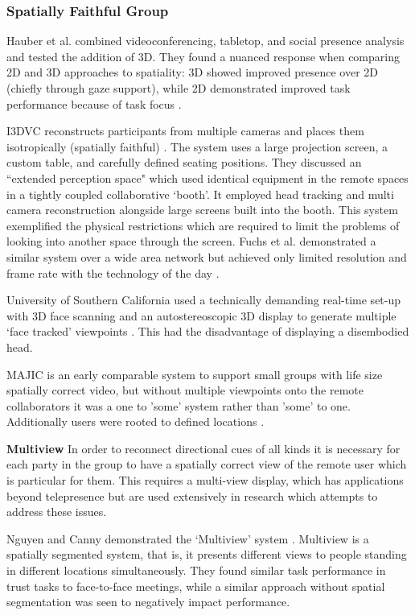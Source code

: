\subsubsection{Spatially Faithful Group}
Hauber et al. combined videoconferencing, tabletop, and social presence analysis and tested the addition of 3D. They found a nuanced response when comparing 2D and 3D approaches to spatiality: 3D showed improved presence over 2D (chiefly through gaze support), while 2D demonstrated improved task performance because of task focus \cite{Hauber2006}.\par
I3DVC reconstructs participants from multiple cameras and places them isotropically (spatially faithful) \cite{Kauff2002, Kauff2002a}. The system uses a large projection screen, a custom table, and carefully defined seating positions. They discussed an ``extended perception space" which used identical equipment in the remote spaces in a tightly coupled collaborative `booth'. It employed head tracking and multi camera reconstruction alongside large screens built into the booth. This system exemplified the physical restrictions which are required to limit the problems of looking into another space through the screen. Fuchs et al. demonstrated a similar system over a wide area network but achieved only limited resolution and frame rate with the technology of the day \cite{Fuchs2002}. \par University of Southern California used a technically demanding real-time set-up with 3D face scanning and an autostereoscopic 3D display to generate multiple `face tracked' viewpoints \cite{Jones2009}. This had the disadvantage of displaying a disembodied head.\par                
MAJIC is an early comparable system to support small groups with life size spatially correct video, but without multiple viewpoints onto the remote collaborators it was a one to 'some' system rather than 'some' to one. Additionally users were rooted to defined locations \cite{Ichikawa1995, Okada1994}.\par


\textbf{Multiview}
In order to reconnect directional cues of all kinds it is necessary for each party in the group to have a spatially correct view of the remote user which is particular for them. This requires a multi-view display, which has applications beyond telepresence but are used extensively in research which attempts to address these issues.\par
Nguyen and Canny demonstrated the `Multiview' system \cite{Nguyen2005}. Multiview is a spatially segmented system, that is, it presents different views to people standing in different locations simultaneously. They found similar task performance in trust tasks to face-to-face meetings, while a similar approach without spatial segmentation was seen to negatively impact performance.\par
                    
